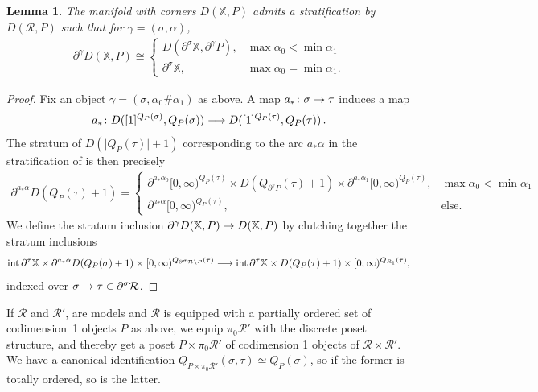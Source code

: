 \documentclass[10pt]{amsart}
\numberwithin{equation}{section}
\newtheorem{lem}[prop]{Lemma}
\theoremstyle{definition}
\DeclareMathOperator{\interior}{int}
\newcommand{\bX}{\mathbb{X}}
\newcommand{\cR}{\mathcal{R}}
\newcommand{\del}{\partial}
\renewcommand{\to}{\mathchoice{\longrightarrow}{\rightarrow}{}{}}
\begin{document}
\begin{lem}\label{lem:D(XP)_stratification}
	The manifold with corners $D(\bX, P)$ admits a stratification by $D(\cR, P)$ such that for $\gamma = (\sigma, \alpha)$,
	\begin{align*}
		\del^{\gamma}D(\bX, P) \cong \begin{cases}
			D(\del^{\sigma} \bX, \del^{\gamma}P ), &  \max \alpha_{0} < \min \alpha_{1} \\
			\del^{\sigma}\bX, & \max \alpha_{0} = \min \alpha_{1}.
		\end{cases}
	\end{align*}
\end{lem}
\begin{proof}
	Fix an object $\gamma = (\sigma, \alpha_{0}\#\alpha_{1})$ as above.
  A map $a_*\colon \sigma \to \tau$ induces a map
	\begin{align*}
		a_{*} \colon D([1]^{Q_{P}(\sigma)}, Q_{P}(\sigma)) \to D([1]^{Q_{P}(\tau)}, Q_{P}(\tau )) \,.
	\end{align*}
	The stratum of $D(\vert Q_{P}(\tau)\vert +1)$ corresponding to the arc $a_{*} \alpha$ in the stratification of  is then precisely
	\begin{align*}
		\del^{a_{*}\alpha} D(Q_{P}(\tau)+1) =
		\begin{cases}
			\del^{a_{*}\alpha_{0}} [0,\infty)^{Q_{P}(\tau)} \times D(Q_{\del^{\gamma}P}(\tau) +1) \times \del^{a_{*}\alpha_{1}} [0,\infty)^{Q_{P}(\tau)}, & \max \alpha_{0} < \min \alpha_{1} \\
			\del^{a_{*}\alpha} [0,\infty)^{Q_{P}(\tau)}, & \text{else.}
		\end{cases}
	\end{align*}
	We define the stratum inclusion $\del^{\gamma} D(\bX, P) \to D(\bX, P)$ by clutching together the stratum inclusions
	\begin{align*}
		\interior \del^{\tau} \bX \times \del^{a_{*}\alpha} D(Q_{P}(\sigma)+1) \times [0,\infty)^{Q_{\del^{\sigma} \cR\setminus P}(\tau)} \to \interior \del^{\tau} \bX \times D(Q_{P}(\tau)+1) \times [0,\infty)^{Q_{R_{1}}(\tau)},
	\end{align*}
	indexed over $\sigma \to \tau \in \del^{\sigma}\cR$.
\end{proof}
If $\cR$ and $\cR'$, are models and $\cR$ is equipped with a partially ordered set of codimension~1 objects $P$ as above, we equip $\pi_{0}\cR'$ with the discrete poset structure, and thereby get a poset $P\times \pi_{0}\cR'$ of codimension 1 objects of $\cR\times \cR'$.
We have a canonical identification $Q_{P\times \pi_{0}\cR'}(\sigma, \tau) \simeq Q_{P}(\sigma)$, so if the former is totally ordered, so is the latter.
\end{document}
